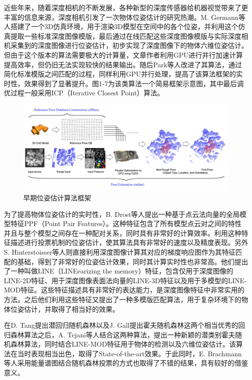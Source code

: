 近些年来，随着深度相机的不断发展，各种新型的深度传感器给机器视觉带来了更丰富的信息来源，深度相机引发了一次物体位姿估计的研究热潮。M. Germann等人搭建了一个3D仿真环境，用于渲染3D模型在空间中的各个位姿，并利用这个仿真提取一些标准深度图像模版，最后通过在线匹配这些深度图像模版与实际深度相机采集到的深度图像进行位姿估计，初步实现了深度图像下的物体六维位姿估计\cite{germann2007automatic}。但由于这个版本的算法需要极大的计算量，文章作者利用GPU进行并行加速计算提高效率，但仍旧无法实现较快的结果输出。随后Park等人改进了其算法，通过简化标准模版之间匹配的过程，同样利用GPU并行处理，提高了该算法框架的实时性，效果得到了显著提升\cite{park2010fast}。图1-7为该类算法一个简易框架示意图，其中最后调优过程一般采用ICP（Iterative Closest Point）算法。
\begin{figure}[htb]
	\centering 
	\includegraphics[width=\textwidth]{./mypic/早期位姿估计算法框架.jpg} 
	\caption{早期位姿估计算法框架} 
\end{figure}

为了提高物体位姿估计的实时性，B. Drost等人提出一种基于点云法向量的全局模型特征PPF（Point Pair Features）。这种特征包含了所有模型点云对之间的特性并且与整个模型之间存在一种配对关系，同时具有非常好的计算效率\cite{drost2010model}。利用这种特征描述进行投票机制的位姿估计，使其算法具有非常好的速度以及精度表现。另外S. Hinterstoisser等人则直接利用深度图像计算其对应的梯度响应图作为其特征匹配的基础，得到了非常好的位姿估计效果，同时其计算实时性也非常高\cite{hinterstoisser2012gradient}。他们提出了一种叫做LINE（LINEearizing the memory）特征，包含仅用于深度图像的LINE-2D特征、用于深度图像表面法向量的LINE-3D特征以及用于多模型的LINE-MOD特征。这些特征描述具有非常好的表达能力，是深度图像特征中非常实用的方法。之后他们利用这些特征又提出了一种多模版匹配算法，用于复杂环境下的物体位姿估计，并取得了相当好的效果\cite{hinterstoisser2011multimodal}。

在D. Tang提出潜回归随机森林\cite{tang2014latent}以及J. Gall提出霍夫随机森林\cite{gall2011hough}这两个相当优秀的回归森林算法之后，A. Tejani等人结合这两种算法，提出一种新颖的潜类别霍夫随机森林算法，同时结合LINE-MOD特征用于物体的检测以及六维位姿估计\cite{tejani2014latent}。该算法在当时表现相当出色，取得了State-of-the-art效果。于此同时，E. Brachmann等人采用能量谱图结合随机森林投票的方式也取得了不错的结果，具有较好的借鉴意义\cite{brachmann2014learning}。

